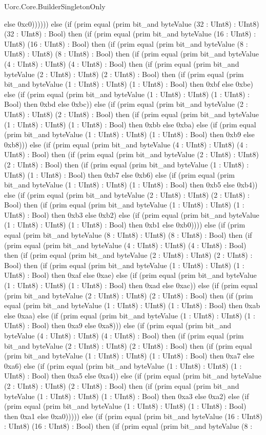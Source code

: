 \begin{lexlean}{Uorc.Core.BuilderSingletonOnly}
\begin{semanticmodule}
{else 0xc0)))))) else (if (prim equal (prim bit_and byteValue (32 : UInt8) : UInt8) (32 : UInt8) : Bool) then (if (prim equal (prim bit_and byteValue (16 : UInt8) : UInt8) (16 : UInt8) : Bool) then (if (prim equal (prim bit_and byteValue (8 : UInt8) : UInt8) (8 : UInt8) : Bool) then (if (prim equal (prim bit_and byteValue (4 : UInt8) : UInt8) (4 : UInt8) : Bool) then (if (prim equal (prim bit_and byteValue (2 : UInt8) : UInt8) (2 : UInt8) : Bool) then (if (prim equal (prim bit_and byteValue (1 : UInt8) : UInt8) (1 : UInt8) : Bool) then 0xbf else 0xbe) else (if (prim equal (prim bit_and byteValue (1 : UInt8) : UInt8) (1 : UInt8) : Bool) then 0xbd else 0xbc)) else (if (prim equal (prim bit_and byteValue (2 : UInt8) : UInt8) (2 : UInt8) : Bool) then (if (prim equal (prim bit_and byteValue (1 : UInt8) : UInt8) (1 : UInt8) : Bool) then 0xbb else 0xba) else (if (prim equal (prim bit_and byteValue (1 : UInt8) : UInt8) (1 : UInt8) : Bool) then 0xb9 else 0xb8))) else (if (prim equal (prim bit_and byteValue (4 : UInt8) : UInt8) (4 : UInt8) : Bool) then (if (prim equal (prim bit_and byteValue (2 : UInt8) : UInt8) (2 : UInt8) : Bool) then (if (prim equal (prim bit_and byteValue (1 : UInt8) : UInt8) (1 : UInt8) : Bool) then 0xb7 else 0xb6) else (if (prim equal (prim bit_and byteValue (1 : UInt8) : UInt8) (1 : UInt8) : Bool) then 0xb5 else 0xb4)) else (if (prim equal (prim bit_and byteValue (2 : UInt8) : UInt8) (2 : UInt8) : Bool) then (if (prim equal (prim bit_and byteValue (1 : UInt8) : UInt8) (1 : UInt8) : Bool) then 0xb3 else 0xb2) else (if (prim equal (prim bit_and byteValue (1 : UInt8) : UInt8) (1 : UInt8) : Bool) then 0xb1 else 0xb0)))) else (if (prim equal (prim bit_and byteValue (8 : UInt8) : UInt8) (8 : UInt8) : Bool) then (if (prim equal (prim bit_and byteValue (4 : UInt8) : UInt8) (4 : UInt8) : Bool) then (if (prim equal (prim bit_and byteValue (2 : UInt8) : UInt8) (2 : UInt8) : Bool) then (if (prim equal (prim bit_and byteValue (1 : UInt8) : UInt8) (1 : UInt8) : Bool) then 0xaf else 0xae) else (if (prim equal (prim bit_and byteValue (1 : UInt8) : UInt8) (1 : UInt8) : Bool) then 0xad else 0xac)) else (if (prim equal (prim bit_and byteValue (2 : UInt8) : UInt8) (2 : UInt8) : Bool) then (if (prim equal (prim bit_and byteValue (1 : UInt8) : UInt8) (1 : UInt8) : Bool) then 0xab else 0xaa) else (if (prim equal (prim bit_and byteValue (1 : UInt8) : UInt8) (1 : UInt8) : Bool) then 0xa9 else 0xa8))) else (if (prim equal (prim bit_and byteValue (4 : UInt8) : UInt8) (4 : UInt8) : Bool) then (if (prim equal (prim bit_and byteValue (2 : UInt8) : UInt8) (2 : UInt8) : Bool) then (if (prim equal (prim bit_and byteValue (1 : UInt8) : UInt8) (1 : UInt8) : Bool) then 0xa7 else 0xa6) else (if (prim equal (prim bit_and byteValue (1 : UInt8) : UInt8) (1 : UInt8) : Bool) then 0xa5 else 0xa4)) else (if (prim equal (prim bit_and byteValue (2 : UInt8) : UInt8) (2 : UInt8) : Bool) then (if (prim equal (prim bit_and byteValue (1 : UInt8) : UInt8) (1 : UInt8) : Bool) then 0xa3 else 0xa2) else (if (prim equal (prim bit_and byteValue (1 : UInt8) : UInt8) (1 : UInt8) : Bool) then 0xa1 else 0xa0))))) else (if (prim equal (prim bit_and byteValue (16 : UInt8) : UInt8) (16 : UInt8) : Bool) then (if (prim equal (prim bit_and byteValue (8 : }
\end{semanticmodule}
\end{lexlean}
